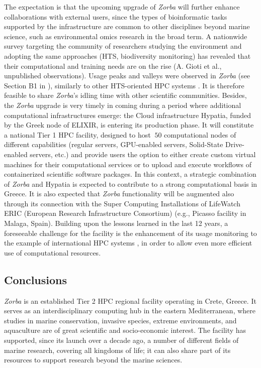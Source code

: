    The expectation is that the upcoming upgrade of \textit{Zorba} will further enhance collaborations with external users, since the types of bioinformatic tasks supported by the infrastructure are common to other disciplines beyond marine science, such as environmental omics research in the broad term. 
   A nationwide survey targeting the community of researchers studying the environment and adopting the same approaches (HTS, biodiversity monitoring) has revealed that their computational and training needs are on the rise (A. Gioti et al., unpublished observations). 
   Usage peaks and valleys were observed in \textit{Zorba} (see Section B1 in \citep{haris_zafeiropoulos_2021_4665308}), similarly to other HTS-oriented HPC systems \citep{lampa2013lessons}. 
   It is therefore feasible to share \textit{Zorba}'s idling time with other scientific communities.
   Besides, the \textit{Zorba} upgrade is very timely in coming during a period where additional computational infrastructures emerge: 
   the Cloud infrastructure Hypatia, funded by the Greek node of ELIXIR, is entering its production phase. 
   It will constitute a national Tier 1 HPC facility, designed to host $~50$ computational nodes of different capabilities (regular servers, GPU-enabled servers, Solid-State Drive-enabled servers, etc.) and provide users the option to either create custom virtual machines for their computational services or to upload and execute workflows of containerized scientific software packages. 
   In this context, a strategic combination of \textit{Zorba} and Hypatia is expected to contribute to a strong computational basis in Greece. 
   It is also expected that \textit{Zorba} functionality will be augmented also through its connection with the Super Computing Installations of LifeWatch ERIC (European Research Infrastructure Consortium) (e.g., Picasso facility in Malaga, Spain). 
   Building upon the lessons learned in the last 12 years, a foreseeable challenge for the facility is the enhancement of its usage monitoring to the example of international HPC systems \citep{dahlo2018tracking}, in order to allow even more efficient use of computational resources.



   \subsection{Conclusions}

   \textit{Zorba} is an established Tier 2 HPC regional facility operating in Crete, Greece. 
   It serves as an interdisciplinary computing hub in the eastern Mediterranean, where studies in marine conservation, invasive species, extreme environments, and aquaculture are of great scientific and socio-economic interest. 
   The facility has supported, since its launch over a decade ago, a number of different fields of marine research, covering all kingdoms of life; 
   it can also share part of its resources to support research beyond the marine sciences.

